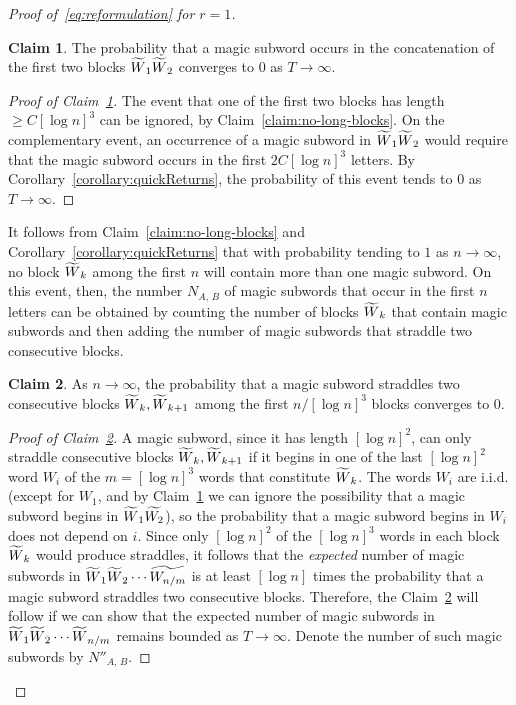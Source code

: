 \documentclass[10pt]{amsart}
\theoremstyle{definition}\newtheorem{defi}[theo]{Definition}\newtheorem{rema}[theo]{Remark}\newtheorem{exam}[theo]{Example}\newtheorem{exem}[theo]{Example}\newtheorem{nota}[theo]{Notation}
\newtheorem{claim}{Claim}}
\let\oldtilde\tilde
\renewcommand*{\tilde}[1]{\mathchoice{\widetilde{#1}}{\widetilde{#1}}{\oldtilde{#1}}{\oldtilde{#1}}}\let\oldforall\forall
\renewcommand*{\forall}{\mathrel{\oldforall}}
\begin{document}
\begin{proof}[Proof of~\eqref{eq:reformulation} for $r= 1$]
\begin{claim}\label{claim:first-block}
The probability that a magic subword occurs in the concatenation of the first two blocks $\tilde{W}_{1}\tilde{W}_{2}$ converges to $0$ as $T \rightarrow \infty$.
\end{claim}

\begin{proof}[Proof of Claim~\ref{claim:first-block}]
The event that one of the first two blocks has length\linebreak$\geq C[\log n]^{3}$ can be ignored, by Claim~\ref{claim:no-long-blocks}. On the complementary event, an occurrence of a magic subword in $\tilde{W}_{1}\tilde{W}_{2}$ would require that the magic subword occurs in the first $2C[\log n]^{3}$ letters. By Corollary~\ref{corollary:quickReturns}, the probability of this event tends to $0$ as $T \rightarrow \infty$.
\end{proof}



It follows from Claim~\ref{claim:no-long-blocks} and Corollary~\ref{corollary:quickReturns} that with probability tending to $1$ as $n \rightarrow \infty$, no block $\tilde{W}_{k}$ among the first $n$ will contain more than one magic subword. On this event, then, the number $N_{A,\,B}$ of magic subwords that occur in the first $n$ letters can be obtained by counting the number of blocks $\tilde{W}_{k}$ that contain magic subwords and then adding the number of magic subwords that straddle two consecutive blocks.


\begin{claim}\label{claim:no-straddles}
As $n \rightarrow \infty$, the probability that a magic subword straddles two consecutive blocks $\tilde{W}_{k},\tilde{W}_{k+1}$ among the first $n/[\log n]^{3}$ blocks converges to $0$.
\end{claim}

\begin{proof}[Proof of Claim~\ref{claim:no-straddles}]
A magic subword, since it has length $[\log n]^{2}$, can only straddle consecutive blocks $\tilde{W}_{k},\tilde{W}_{k+1}$ if it begins in one of the last $[\log n]^{2}$ word $W_{i}$ of the $m=[\log n]^{3}$ words that constitute $\tilde{W}_{k}$. The words $W_{i}$ are i.i.d. (except for $W_{1}$, and by Claim~\ref{claim:first-block} we can ignore the possibility that a magic subword begins in $\tilde{W}_{1}\tilde{W_{2}}$), so the probability that a magic subword begins in $W_{i}$ does not depend on $i$. Since only $[\log n]^{2}$ of the $[\log n]^{3}$ words in each block $\tilde{W}_{k}$ would produce straddles, it follows that the \emph{expected} number of magic subwords in $\tilde{W}_{1}\tilde{W}_{2}\dotsb \tilde{W_{n/m}}$ is at least $[\log n]$ times the probability that a magic subword straddles two consecutive blocks. Therefore, the Claim~\ref{claim:no-straddles} will follow if we can show that the expected number of magic subwords in $\tilde{W}_{1}\tilde{W}_{2}\dotsb \tilde{W}_{n/m}$ remains bounded as $T \rightarrow \infty$. Denote the number of such magic subwords by $N''_{A,\,B}$.


\end{proof}
\end{proof}
\end{document}
